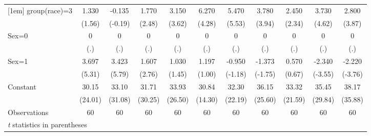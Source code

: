 \begin{table}[htbp]
\begin{tabular}{l*{10}{c}}
[1em]
group(race)=3       &       1.330&      -0.135&       1.770&       3.150&       6.270&       5.470&       3.780&       2.450&       3.730&       2.800\\
                    &      (1.56)&     (-0.19)&      (2.48)&      (3.62)&      (4.28)&      (5.53)&      (3.94)&      (2.34)&      (4.62)&      (3.87)\\
[1em]
Sex=0               &           0&           0&           0&           0&           0&           0&           0&           0&           0&           0\\
                    &         (.)&         (.)&         (.)&         (.)&         (.)&         (.)&         (.)&         (.)&         (.)&         (.)\\
[1em]
Sex=1               &       3.697&       3.423&       1.607&       1.030&       1.197&      -0.950&      -1.373&       0.570&      -2.340&      -2.220\\
                    &      (5.31)&      (5.79)&      (2.76)&      (1.45)&      (1.00)&     (-1.18)&     (-1.75)&      (0.67)&     (-3.55)&     (-3.76)\\
[1em]
Constant            &       30.15&       33.10&       31.71&       33.93&       30.84&       32.30&       36.15&       33.32&       35.45&       38.17\\
                    &     (24.01)&     (31.08)&     (30.25)&     (26.50)&     (14.30)&     (22.19)&     (25.60)&     (21.59)&     (29.84)&     (35.88)\\
\hline
Observations        &          60&          60&          60&          60&          60&          60&          60&          60&          60&          60\\
\hline\hline
\multicolumn{11}{l}{\footnotesize \textit{t} statistics in parentheses}\\
\end{tabular}
\end{table}
